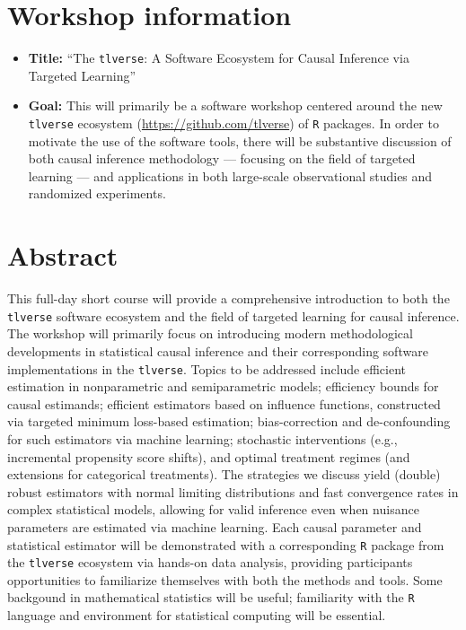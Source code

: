 \documentclass[a4paper,11pt]{texMemo}
\begin{document}
\maketitle

\vspace{-0.25in}
\section{Workshop information}

\begin{itemize}
  \itemsep1pt
  \item \textbf{Title:} ``The \texttt{tlverse}: A Software Ecosystem for Causal
    Inference via Targeted Learning''
  \item \textbf{Goal:} This will primarily be a software workshop centered
    around the new \texttt{tlverse} ecosystem (\url{https://github.com/tlverse})
    of \texttt{R} packages. In order to motivate the use of the software tools,
    there will be substantive discussion of both causal inference methodology
    --- focusing on the field of targeted learning --- and applications in both
    large-scale observational studies and randomized experiments.
\end{itemize}

\section{Abstract}

This full-day short course will provide a comprehensive introduction to both the
\texttt{tlverse} software ecosystem and the field of targeted learning for
causal inference. The workshop will primarily focus on introducing modern
methodological developments in statistical causal inference and their
corresponding software implementations in the \texttt{tlverse}. Topics to be
addressed include efficient estimation in nonparametric and semiparametric
models; efficiency bounds for causal estimands; efficient estimators based on
influence functions, constructed via targeted minimum loss-based estimation;
bias-correction and de-confounding for such estimators via machine learning;
stochastic interventions (e.g., incremental propensity score shifts), and
optimal treatment regimes (and extensions for categorical treatments). The
strategies we discuss yield (double) robust estimators with normal limiting
distributions and fast convergence rates in complex statistical models, allowing
for valid inference even when nuisance parameters are estimated via machine
learning. Each causal parameter and statistical estimator will be demonstrated
with a corresponding \texttt{R} package from the \texttt{tlverse} ecosystem via
hands-on data analysis, providing participants opportunities to familiarize
themselves with both the methods and tools. Some backgound in mathematical
statistics will be useful; familiarity with the \texttt{R} language and
environment for statistical computing will be essential.
\end{document}

